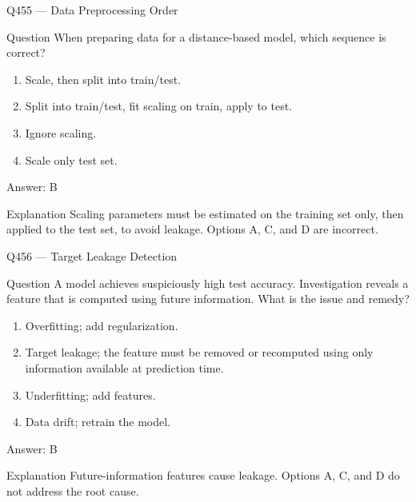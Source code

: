 \documentclass[aspectratio=169,8pt]{beamer}
\begin{document}
	\begin{frame}{Q455 --- Data Preprocessing Order}
		\begin{block}{Question}
			When preparing data for a distance-based model, which sequence is correct?
			\begin{enumerate}
				\item Scale, then split into train/test.
				\item Split into train/test, fit scaling on train, apply to test.
				\item Ignore scaling.
				\item Scale only test set.
			\end{enumerate}
		\end{block}
		\begin{exampleblock}{Answer: B}\end{exampleblock}
		\begin{block}{Explanation}
			Scaling parameters must be estimated on the training set only, then applied to the test set, to avoid leakage. Options A, C, and D are incorrect.
		\end{block}
	\end{frame}
	
	\begin{frame}{Q456 --- Target Leakage Detection}
		\begin{block}{Question}
			A model achieves suspiciously high test accuracy. Investigation reveals a feature that is computed using future information. What is the issue and remedy?
			\begin{enumerate}
				\item Overfitting; add regularization.
				\item Target leakage; the feature must be removed or recomputed using only information available at prediction time.
				\item Underfitting; add features.
				\item Data drift; retrain the model.
			\end{enumerate}
		\end{block}
		\begin{exampleblock}{Answer: B}\end{exampleblock}
		\begin{block}{Explanation}
			Future-information features cause leakage. Options A, C, and D do not address the root cause.
		\end{block}
	\end{frame}
	
\end{document}
